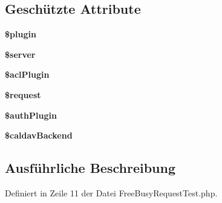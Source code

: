 \subsection*{Geschützte Attribute}
\begin{DoxyCompactItemize}
\item 
\mbox{\label{class_sabre_1_1_cal_d_a_v_1_1_schedule_1_1_free_busy_request_test_a5781e476f4f2fcc9146ede6dd1a36840}} 
{\bfseries \$plugin}
\item 
\mbox{\label{class_sabre_1_1_cal_d_a_v_1_1_schedule_1_1_free_busy_request_test_af5a2bdd407a3f1dbeb9cfeb0d2b922b0}} 
{\bfseries \$server}
\item 
\mbox{\label{class_sabre_1_1_cal_d_a_v_1_1_schedule_1_1_free_busy_request_test_a95bcac6bbfd0c6fb11839ea5eb3fed0d}} 
{\bfseries \$acl\+Plugin}
\item 
\mbox{\label{class_sabre_1_1_cal_d_a_v_1_1_schedule_1_1_free_busy_request_test_a1c2001026b4a771e72629ad2c6cb6485}} 
{\bfseries \$request}
\item 
\mbox{\label{class_sabre_1_1_cal_d_a_v_1_1_schedule_1_1_free_busy_request_test_afe1d57f131cedf68ee0371a3d36d00ba}} 
{\bfseries \$auth\+Plugin}
\item 
\mbox{\label{class_sabre_1_1_cal_d_a_v_1_1_schedule_1_1_free_busy_request_test_a64d4ac0c00707fcaa0b31c0425b55c78}} 
{\bfseries \$caldav\+Backend}
\end{DoxyCompactItemize}


\subsection{Ausführliche Beschreibung}


Definiert in Zeile 11 der Datei Free\+Busy\+Request\+Test.\+php.



